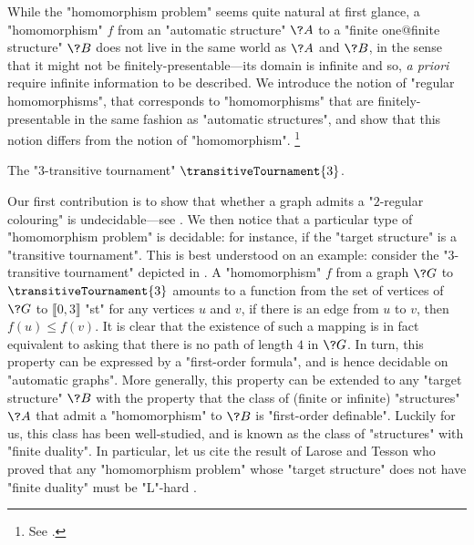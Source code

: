 While the "homomorphism problem" seems quite natural at first glance, a "homomorphism" $f$
from an "automatic structure" $\?A$ to a "finite one@finite structure" $\?B$ does not live
in the same world as $\?A$ and $\?B$, in the sense that it might not be finitely-presentable---its domain is infinite and so, \emph{a priori} require infinite information to be described.
We introduce the notion of "regular homomorphisms", that corresponds to "homomorphisms" that
are finitely-presentable in the same fashion as "automatic structures", and show that
this notion differs from the notion of "homomorphism".%
\footnote{See .}

\begin{marginfigure}
	\centering
	\begin{tikzpicture}
		
	\end{tikzpicture}
	\caption{
		\AP\label{fig:3-transitive-tournament}
		The "$3$-transitive tournament" $\transitiveTournament{3}$.
	}
\end{marginfigure}
Our first contribution is to show that whether a graph admits a "$2$-regular colouring" is undecidable---see . We then notice that a particular type of
"homomorphism problem" is decidable: for instance, if the "target structure"
is a "transitive tournament". This is best understood on an example: consider the "$3$-transitive 
tournament" depicted in .
A "homomorphism" $f$ from a graph $\?G$ to $\transitiveTournament{3}$ amounts to a function
from the set of vertices of $\?G$ to $\lBrack 0,3\rBrack$ "st"
for any vertices $u$ and $v$, if there is an edge from $u$ to $v$, then
$f(u) \leq f(v)$. It is clear that the existence of such a mapping is in fact equivalent 
to asking that there is no path of length $4$ in $\?G$.
In turn, this property can be expressed by a "first-order formula", and is hence decidable
on "automatic graphs".
More generally, this property can be extended to any "target structure" $\?B$ with the property
that the class of (finite or infinite) "structures" $\?A$ that admit a "homomorphism" to $\?B$
is "first-order definable".
Luckily for us, this class has been well-studied, and is known as the class of "structures"
with "finite duality". In particular, let us cite the result of Larose and Tesson
who proved that any "homomorphism problem" whose "target structure" does not have "finite duality"
must be "L"-hard \cite{LaroseTesson2009UniversalAlgebraCSP}.

